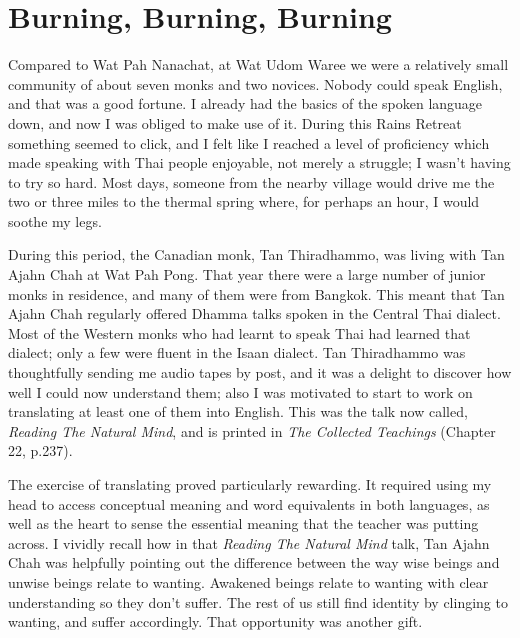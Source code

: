 \chapter{Burning, Burning, Burning}

Compared to Wat Pah Nanachat, at Wat Udom Waree we were a relatively small
community of about seven monks and two novices. Nobody could speak
English, and that was a good fortune. I already had the basics of the
spoken language down, and now I was obliged to make use of it. During
this Rains Retreat something seemed to click, and I felt like I reached
a level of proficiency which made speaking with Thai people enjoyable,
not merely a struggle; I wasn't having to try so hard. Most days,
someone from the nearby village would drive me the two or three miles to
the thermal spring where, for perhaps an hour, I would soothe my legs.

During this period, the Canadian monk, Tan Thiradhammo, was living with
Tan Ajahn Chah at Wat Pah Pong. That year there were a large number of
junior monks in residence, and many of them were from Bangkok. This
meant that Tan Ajahn Chah regularly offered Dhamma talks spoken in the
Central Thai dialect. Most of the Western monks who had learnt to speak
Thai had learned that dialect; only a few were fluent in the Isaan
dialect. Tan Thiradhammo was thoughtfully sending me audio tapes by post,
and it was a delight to discover how well I could now understand them;
also I was motivated to start to work on translating at least one of
them into English. This was the talk now called,
\emph{Reading The Natural Mind}, and is printed in
\emph{The Collected Teachings}\cite{collected} (Chapter 22, p.237).

The exercise of translating proved particularly rewarding. It required
using my head to access conceptual meaning and word equivalents in both
languages, as well as the heart to sense the essential meaning that the
teacher was putting across. I vividly recall how in that \emph{Reading
The Natural Mind} talk, Tan Ajahn Chah was helpfully pointing out the
difference between the way wise beings and unwise beings relate to
wanting. Awakened beings relate to wanting with clear understanding so
they don't suffer. The rest of us still find identity by clinging to
wanting, and suffer accordingly. That opportunity was another gift.

